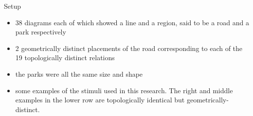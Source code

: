 \begin{frame}{Setup}
	\begin{itemize}
		\item 38 diagrams each of which showed a line and a region, said to be a road and a park respectively
		\item 2 geometrically distinct placements of the road corresponding to each of the 19 topologically distinct relations
		\item the parks were all the same size and shape
		\item some examples of the stimuli used in this research. The right and middle examples in the lower row are topologically identical but geometrically-distinct.
	\end{itemize}
\end{frame}

